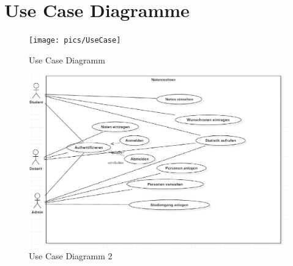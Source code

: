 \documentclass[12pt,a4paper,parskip]{scrreprt}
\begin{document}
\section{Use Case Diagramme}
\begin{figure}[h!]
\centering
\texttt{[image: pics/UseCase]}
\caption[Use Case Diagramm]{Use Case Diagramm}
\label{fig:UseCase}
\end{figure}
\begin{figure}[h!]
\centering
\includegraphics[width=1\linewidth]{pics/UseCase2}
\caption[Use Case Diagramm]{Use Case Diagramm 2}
\label{fig:UseCase2}
\end{figure}
\clearpage
\end{document}
